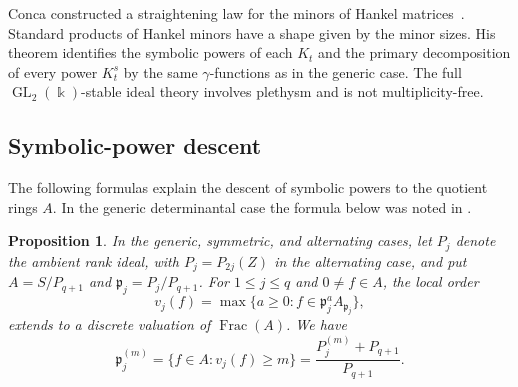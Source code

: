 \documentclass[11pt,reqno]{amsart}
\numberwithin{equation}{subsection}
\newtheorem{proposition}[theorem]{Proposition}
\theoremstyle{definition}
\theoremstyle{remark}
\DeclareMathOperator{\GL}{GL}
\newcommand{\kfield}{\Bbbk}
\newcommand{\fp}{\mathfrak p}
\begin{document}
Conca constructed a straightening law for the minors of Hankel
matrices~\cite[Theorem 2.6]{ConcaHankel}.  Standard products of Hankel minors have a
shape given by the minor sizes.  His theorem identifies the symbolic
powers of each $K_t$ and the primary decomposition of every power
$K_t^s$ by the same $\gamma$-functions as in the generic case.  The
full $\GL_2(\kfield)$-stable ideal theory involves plethysm and is not
multiplicity-free. 

\subsection{Symbolic-power descent}

The following formulas explain the descent of symbolic powers to the quotient rings $A$. In the generic determinantal case the formula below was noted in  \cite[Remark~10.5]{BrunsVetter}.

\begin{proposition}
\label{prop:classical-descent}
In the generic, symmetric, and alternating cases, let $P_j$
denote the ambient rank ideal, with $P_j=P_{2j}(Z)$ in the
alternating case, and put
$A=S/P_{q+1}$ and $\fp_j=P_j/P_{q+1}$.
For $1\le j\le q$ and $0\ne f\in A$, the local order
\[
 v_j(f)=\max\{a\ge0:f\in\fp_j^aA_{\fp_j}\},
\]
extends to a discrete valuation of $\operatorname{Frac}(A)$. We have
\begin{equation}\label{eq:quotient-symbolic-descent}
 \fp_j^{(m)}
 =\{f\in A:v_j(f)\ge m\}
 =\frac{P_j^{(m)}+P_{q+1}}{P_{q+1}}.
\end{equation}
\end{proposition}
\end{document}
